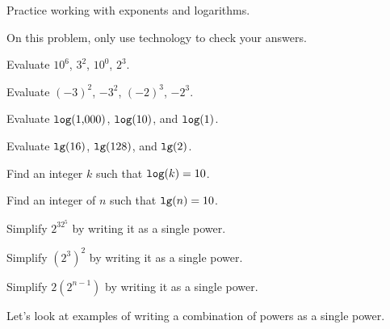Practice working with exponents and logarithms.

\begin{act}  
    \label{act_exp_logs}  
    On this problem, only use technology to check your answers.
    \begin{actpart}
        \item Evaluate $10^6$, $3^2$, $10^0$, $2^3$. 
        \item Evaluate $(-3)^2$, $-3^2$, $(-2)^3$, $-2^3$. 
        \item Evaluate $\texttt{log}(\text{1,000})$, $\texttt{log}(10)$, and $\texttt{log}(1)$.
        \item Evaluate $\texttt{lg}(16)$, $\texttt{lg}(\text{128})$, and $\texttt{lg}(2)$.
        \item Find an integer $k$ such that $\texttt{log}(k) = 10$.       
        \item Find an integer of $n$ such that $\texttt{lg}(n) = 10$.
        \item Simplify $2^32^5$ by writing it as a single power.
        \item Simplify $(2^3)^2$ by writing it as a single power.
        \item Simplify $2(2^{n-1})$ by writing it as a single power. 
     \end{actpart}
\end{act}

Let's look at examples of writing a combination of powers as a single power.

